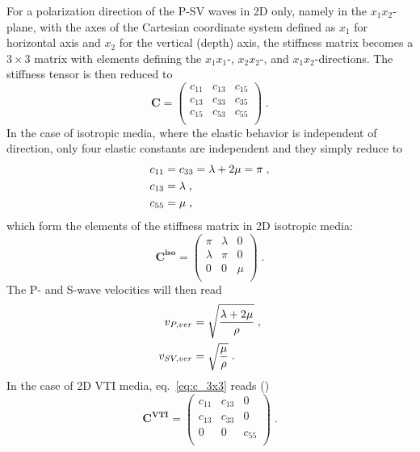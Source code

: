 For a polarization direction of the P-SV waves in 2D only, namely in the $x_1x_2$-plane, with the axes of the Cartesian coordinate system defined as $x_1$ for horizontal axis and $x_2$ for the vertical (depth) axis, the stiffness matrix becomes a $3 \times 3$ matrix with elements defining the $x_1x_1$-, $x_2x_2$-, and $x_1x_2$-directions. The stiffness tensor is then reduced to 
\begin{equation}
    \mathbf{C} =
    \begin{pmatrix}
    c_{11} & c_{13} & c_{15} \\
    c_{13} & c_{33} & c_{35} \\
    c_{15} & c_{53} & c_{55} \\
    \end{pmatrix}\;.
    \label{eq:c_3x3}
\end{equation}
In the case of isotropic media, where the elastic behavior is independent of direction, only four elastic constants are independent and they simply reduce to
\begin{subequations}
\allowdisplaybreaks
    \begin{align}
        c_{11} &= c_{33}=\lambda+2\mu = \pi\;,\\
        c_{13} &= \lambda\;,\\
        c_{55} &= \mu\;,
    \end{align}
    \label{eq:c_iso_ij}
\end{subequations}
which form the elements of the stiffness matrix in 2D isotropic media:
\begin{equation}
    \mathbf{C}^\mathbf{iso} =
    \begin{pmatrix}
    \pi & \lambda & 0 \\
    \lambda & \pi & 0 \\
    0 & 0 & \mu \\
    \end{pmatrix}\;.
    \label{eq:c_iso_3x3}
\end{equation}
The P- and S-wave velocities will then read
\begin{subequations}
\allowdisplaybreaks
    \begin{align}
        v_{P,ver} &= \sqrt{\frac{\lambda+2\mu}{\rho}}\;,\\
        v_{SV,ver} &= \sqrt{\frac{\mu}{\rho}}\;.
    \end{align}
\end{subequations}
In the case of 2D VTI media, eq.~\ref{eq:c_3x3} reads (\cite{Thomsen:86})
\begin{equation}
    \mathbf{C}^\mathbf{VTI} =
    \begin{pmatrix}
    c_{11} & c_{13} & 0 \\
    c_{13} & c_{33} & 0 \\
    0 & 0 & c_{55} \\
    \end{pmatrix}\;.
    \label{eq:c_vti_3x3}
\end{equation}
